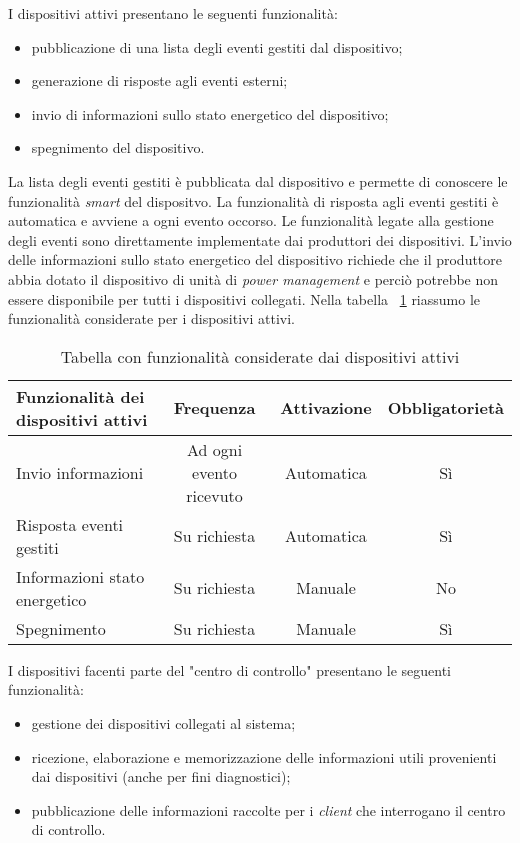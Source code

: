 I dispositivi attivi presentano le seguenti funzionalità:
\begin{itemize}
	\item pubblicazione di una lista degli eventi gestiti dal dispositivo;
	\item generazione di risposte agli eventi esterni;
	\item invio di informazioni sullo stato energetico del dispositivo;
	\item spegnimento del dispositivo.
\end{itemize}

La lista degli eventi gestiti è pubblicata dal dispositivo e permette di conoscere le funzionalità \emph{smart} del dispositvo.
La funzionalità di risposta agli eventi gestiti è automatica e avviene a ogni evento occorso.
Le funzionalità legate alla gestione degli eventi sono direttamente implementate dai produttori dei dispositivi.
L'invio delle informazioni sullo stato energetico del dispositivo richiede che il produttore abbia dotato il dispositivo di unità di \emph{power management} e perciò potrebbe non essere disponibile per tutti i dispositivi collegati.
Nella tabella ~\ref{tab:funz-disp-attivi} riassumo le funzionalità considerate per i dispositivi attivi.

\begin{table}[H]
\caption{Tabella con funzionalità considerate dai dispositivi attivi}
\label{tab:funz-disp-attivi}
\begin{tabularx}{\linewidth}{|X|c|c|c|}
\hline
\textbf{Funzionalità dei dispositivi attivi} & \textbf{Frequenza} & \textbf{Attivazione} & \textbf{Obbligatorietà} \\
\hline
Invio informazioni & Ad ogni evento ricevuto & Automatica & Sì \\
\hline
Risposta eventi gestiti & Su richiesta & Automatica & Sì \\
\hline
Informazioni stato energetico & Su richiesta & Manuale & No \\
\hline
Spegnimento & Su richiesta & Manuale & Sì \\
\hline
\end{tabularx}
\end{table}

I dispositivi facenti parte del "centro di controllo" presentano le seguenti funzionalità:
\begin{itemize}
	\item gestione dei dispositivi collegati al sistema;
	\item ricezione, elaborazione e memorizzazione delle informazioni utili provenienti dai dispositivi (anche per fini diagnostici);
	\item pubblicazione delle informazioni raccolte per i \emph{client} che interrogano il centro di controllo.
\end{itemize}

